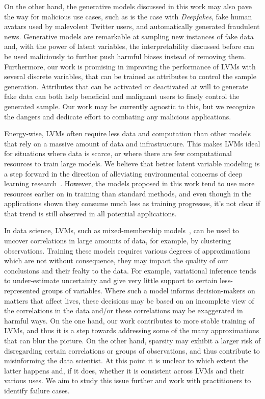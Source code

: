 On the other hand, the generative models discussed in this work may
also pave the way for malicious use cases, such as is the case with
\emph{Deepfakes}, fake human avatars used by malevolent Twitter
users, and automatically generated fraudulent news. Generative models
are remarkable at sampling new instances of fake data and, with the
power of latent variables, the interpretability discussed before can
be used maliciously to further push harmful biases instead of
removing them. Furthermore, our work is promising in improving the
performance of LVMs with several discrete
variables, that can be trained as attributes to control the sample
generation. Attributes that can be activated or deactivated at will
to generate fake data can both help beneficial and malignant users to
finely control the generated sample. Our work may be currently
agnostic to this, but we recognize the dangers and dedicate effort to
combating any malicious applications.

Energy-wise, LVMs often require less data and
computation than other models that rely on a massive amount of data
and infrastructure. This makes LVMs ideal for
situations where data is scarce, or where there are few computational
resources to train large models. We believe that better latent
variable modeling is a step forward in the direction of alleviating
environmental concerns of deep learning
research~\citep{strubell2019energy}. However, the models proposed in
this work tend to use more resources earlier on in training than
standard methods, and even though in the applications shown they
consume much less as training progresses, it's not clear if that
trend is still observed in all potential applications.

In data science, LVMs, such as
mixed-membership models~\citep{blei2014build}, can be used to uncover
correlations in large amounts of data, for example, by clustering
observations. Training these models requires various degrees of
approximations which are not without consequence, they may impact the
quality of our conclusions and their fealty to the data. For example,
variational inference tends to under-estimate uncertainty and give
very little support to certain less-represented groups of variables.
Where such a model informs decision-makers on matters that affect
lives, these decisions may be based on an incomplete view of the
correlations in the data and/or these correlations may be exaggerated
in harmful ways. On the one hand, our work contributes to more stable
training of LVMs, and thus it is a step towards addressing some of
the many approximations that can blur the picture. On the other hand,
sparsity may exhibit a larger risk of disregarding certain
correlations or groups of observations, and thus contribute to
misinforming the data scientist. At this point it is unclear to which
extent the latter happens and, if it does, whether it is consistent
across LVMs and their various uses. We aim to study this issue
further and work with practitioners to identify failure cases.

\cleardoublepage

\singlespacing